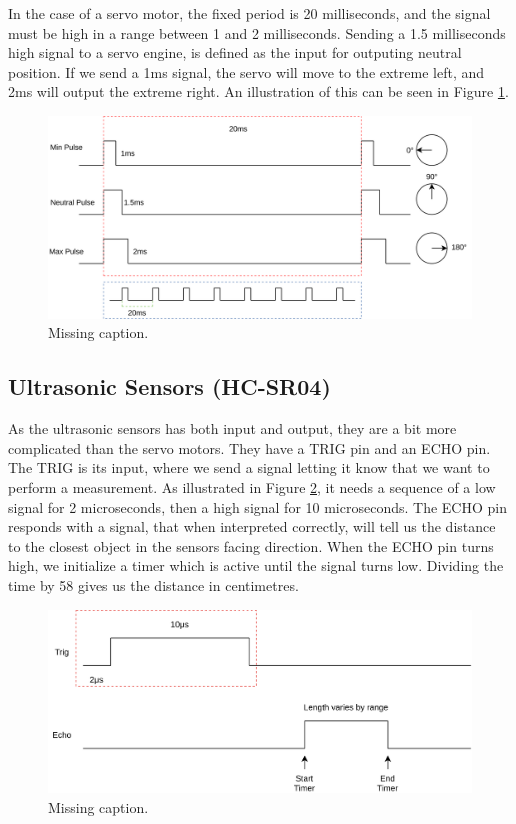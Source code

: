 \documentclass{article}
\begin{document}
In the case of a servo motor, the fixed period is 20 milliseconds, and the signal must be high in a range between 1 and 2 milliseconds. Sending a 1.5 milliseconds high signal to a servo engine, is defined as the input for outputing neutral position. If we send a 1ms signal, the servo will move to the extreme left, and 2ms will output the extreme right. An illustration of this can be seen in Figure \ref{servo}.

\begin{figure}[H]
	\centering
	\includegraphics[width=\linewidth]{servo.png}
	\caption{Missing caption.}
	\label{servo}
\end{figure}

\subsection{Ultrasonic Sensors (HC-SR04)}
As the ultrasonic sensors has both input and output, they are a bit more complicated than the servo motors. They have a TRIG pin and an ECHO pin.\\ 

The TRIG is its input, where we send a signal letting it know that we want to perform a measurement. As illustrated in Figure \ref{ultrasonic-sensor}, it needs a sequence of a low signal for 2 microseconds, then a high signal for 10 microseconds. The ECHO pin responds with a signal, that when interpreted correctly, will tell us the distance to the closest object in the sensors facing direction. When the ECHO pin turns high, we initialize a timer which is active until the signal turns low. Dividing the time by 58 gives us the distance in centimetres.\\

\begin{figure}[H]
	\centering
	\includegraphics[width=\linewidth]{ultrasonic-sensor.png}
	\caption{Missing caption.}
	\label{ultrasonic-sensor}
\end{figure}
\end{document}
